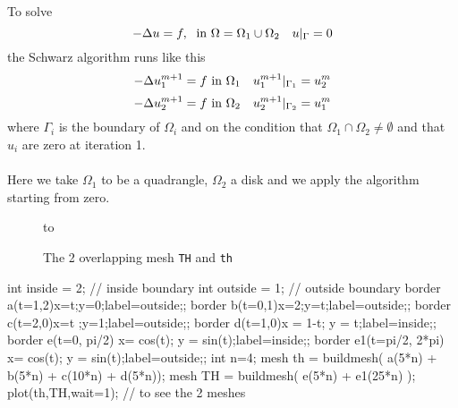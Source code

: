 \documentclass[twoside]{book}
\newif\ifpdf
\def\Blue#1{\textcolor{blue}{#1}}
\def\hin{\hbox{ in }}
\def\eq#1{\Blue{\[#1\]}}
\def\HLINE#1{\hbox to \hsize {#1}}
\begin{document}
\graphicspath{{./}{plots/}}
\ifpdf
\DeclareGraphicsExtensions{.pdf, .jpg, .tif}
\else
{}
\fi

\let\subsubsection\subsection
\let\subsection\section
\let\section\chapter


\label{schwarz-overlap}
To solve 
\eq{ -\Delta u =f,\; \hin\Omega=\Omega_1\cup\Omega_2\quad u|_\Gamma=0}
the Schwarz algorithm  runs like this
\eq{
    -\Delta u^{m+1}_1=f\hin\Omega_1\quad
    u^{m+1}_1|_{\Gamma_1}=u^m_2
 }
\eq{
    -\Delta u^{m+1}_2=f\hin\Omega_2\quad
    u^{m+1}_2|_{\Gamma_2}=u^m_1
}
 where $\Gamma_i$ is the boundary of $\Omega_i$ and on the
condition that $\Omega_1\cap\Omega_2\ne\emptyset$ and that $u_i$
are zero at iteration 1.
\\\\
Here we take $\Omega_1$ to be a quadrangle, $\Omega_2$ a disk and
we apply the algorithm starting from zero.
\begin{figure}[hbt]
\HLINE{\hss
\texttt{[image: schwarz-th]} \hss}
\caption{ The 2 overlapping mesh \texttt{TH} and \texttt{th}  }
\end{figure}

 \bFF

int inside = 2;  //  inside boundary
int outside = 1; //  outside boundary
border a(t=1,2){x=t;y=0;label=outside;};
border b(t=0,1){x=2;y=t;label=outside;};
border c(t=2,0){x=t ;y=1;label=outside;};
border d(t=1,0){x = 1-t; y = t;label=inside;};
border e(t=0, pi/2){ x= cos(t); y = sin(t);label=inside;};
border e1(t=pi/2, 2*pi){ x= cos(t); y = sin(t);label=outside;};
int n=4;
mesh th = buildmesh( a(5*n) + b(5*n) + c(10*n) + d(5*n));
mesh TH = buildmesh( e(5*n) + e1(25*n) );
plot(th,TH,wait=1);  //  to see the 2 meshes
\eFF
\end{document}
